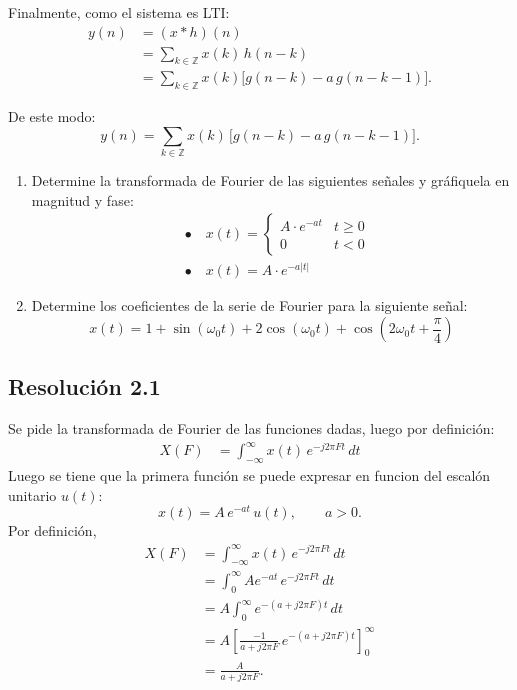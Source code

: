 \documentclass[
  11pt,
  letterpaper,
   addpoints,
   answers
  ]{exam}
\begin{document}
\begin{questions}
\begin{solution}
Finalmente, como el sistema es LTI:
\begin{align}
y(n) &= (x * h)(n) \\
&= \sum_{k \in \mathbb{Z}} x(k)\,h(n-k) \\
&= \sum_{k \in \mathbb{Z}} x(k)\Big[g(n-k) - a\,g(n-k-1)\Big].
\end{align}

De este modo:
\begin{equation}
y(n) = \sum_{k \in \mathbb{Z}} x(k)\,\big[g(n-k) - a\,g(n-k-1)\big].
\end{equation}

\end{solution}

\question
\begin{enumerate}
  \item Determine la transformada de Fourier de las siguientes señales y gráfiquela en magnitud y fase:
\begin{align*}
  &\bullet\quad x(t) = \begin{cases}
    A \cdot e^{-a t} & t \geq 0 \\
    0 & t < 0
  \end{cases} \\
  &\bullet\quad x(t) = A \cdot e^{-a|t|}
\end{align*}

\item Determine los coeficientes de la serie de Fourier para la siguiente señal:
\begin{equation}
  x(t) = 1 + \sin(\omega_0 t) + 2\cos(\omega_0 t) + \cos\left(2\omega_0 t + \frac{\pi}{4}\right)
\end{equation}
\end{enumerate}
\begin{solution}
\subsection*{Resolución 2.1}
Se pide la transformada de Fourier de las funciones dadas, luego por definición:
\begin{align}
  X(F) &= \int_{-\infty}^{\infty} x(t)\,e^{-j2\pi F t}\,dt
\end{align}
Luego se tiene que la primera función se puede expresar en funcion del escalón unitario \(u(t)\):
\[
x(t)=A\,e^{-a t}\,u(t),\qquad a>0.
\]
Por definición,
\begin{align}
X(F)
  &= \int_{-\infty}^{\infty} x(t)\,e^{-j2\pi F t}\,dt \\
  &= \int_{0}^{\infty} A e^{-a t}\,e^{-j2\pi F t}\,dt \\
  &= A\int_{0}^{\infty} e^{-(a+j2\pi F)t}\,dt \\
  &= A\left[\frac{-1}{a+j2\pi F}\,e^{-(a+j2\pi F)t}\right]_{0}^{\infty} \\
  &= \frac{A}{a+j2\pi F}.
\end{align}


\end{solution}
\end{questions}
\end{document}
